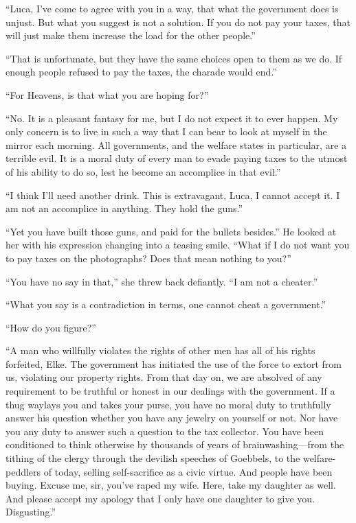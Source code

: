 ``Luca, I've come to agree with you in a way, that what the government does is unjust. But what you suggest is not a solution. If you do not pay your taxes, that will just make them increase the load for the other people.''

``That is unfortunate, but they have the same choices open to them as we do. If enough people refused to pay the taxes, the charade would end.''

``For Heavens, is that what you are hoping for?''

``No. It is a pleasant fantasy for me, but I do not expect it to ever happen. My only concern is to live in such a way that I can bear to look at myself in the mirror each morning. All governments, and the welfare states in particular, are a terrible evil. It is a moral duty of every man to evade paying taxes to the utmost of his ability to do so, lest he become an accomplice in that evil.''

``I think I'll need another drink. This is extravagant, Luca, I cannot accept it. I am not an accomplice in anything. They hold the guns.''

``Yet you have built those guns, and paid for the bullets besides.'' He looked at her with his expression changing into a teasing smile. ``What if I do not want you to pay taxes on the photographs? Does that mean nothing to you?''

``You have no say in that,'' she threw back defiantly. ``I am not a cheater.''

``What you say is a contradiction in terms, one cannot cheat a government.''

``How do you figure?''

``A man who willfully violates the rights of other men has all of his rights forfeited, Elke. The government has initiated the use of the force to extort from us, violating our property rights. From that day on, we are absolved of any requirement to be truthful or honest in our dealings with the government. If a thug waylays you and takes your purse, you have no moral duty to truthfully answer his question whether you have any jewelry on yourself or not. Nor have you any duty to answer such a question to the tax collector. You have been conditioned to think otherwise by thousands of years of brainwashing---from the tithing of the clergy through the devilish speeches of Goebbels, to the welfare-peddlers of today, selling self-sacrifice as a civic virtue. And people have been buying. Excuse me, sir, you've raped my wife. Here, take my daughter as well. And please accept my apology that I only have one daughter to give you. Disgusting.''

